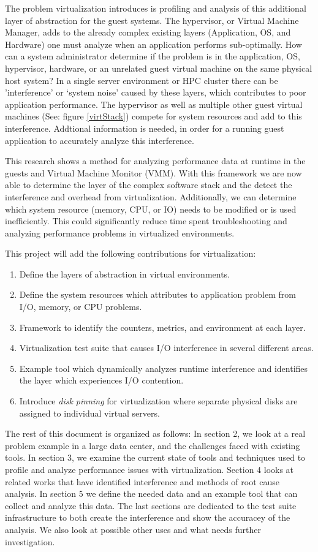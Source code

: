\indent The problem virtualization introduces is profiling and analysis of this additional layer of abstraction for the guest systems.  The hypervisor, or Virtual Machine Manager, adds to the already complex existing layers (Application, OS, and Hardware) one must analyze when an application performs sub-optimally.  How can a system administrator determine if the problem is in the application, OS, hypervisor, hardware, or an unrelated guest virtual machine on the same physical host system?  In a single server environment or HPC cluster there can be 'interference' \cite{paul} or ‘system noise' caused by these layers, which contributes to poor application performance.  The hypervisor as well as multiple other guest virtual machines (See: figure \ref{virtStack}) compete for system resources and add to this interference.  Addtional information is needed, in order for a running guest application to accurately analyze this interference.

\indent This research shows a method for analyzing performance data at runtime in the guests and Virtual Machine Monitor (VMM).   With this framework we are now able to determine the layer of the complex software stack and the detect the interference and overhead from virtualization.  Additionally, we can determine which system resource (memory, CPU, or IO) needs to be modified or is used inefficiently.  This could significantly reduce time spent troubleshooting and analyzing performance problems in virtualized environments.

\indent This project will add the following contributions for virtualization:
\begin{enumerate}
\item Define the layers of abstraction in virtual environments.
\item Define the system resources which attributes to application problem from I/O, memory, or CPU problems.
\item Framework to identify the counters, metrics, and environment at each layer.
\item Virtualization test suite that causes I/O interference in several different areas.
\item Example tool which dynamically analyzes runtime interference and identifies the layer which experiences I/O contention.
\item Introduce \emph{disk pinning} for virtualization where separate physical disks are assigned to individual virtual servers.
\end{enumerate}

\indent The rest of this document is organized as follows:  In section 2, we look at a real problem example in a large data center, and the challenges faced with existing tools.  In section 3, we examine the current state of tools and techniques used to profile and analyze performance issues with virtualization.  Section 4 looks at related works that have identified interference and methods of root cause analysis.  In section 5 we define the needed data and an example tool that can collect and analyze this data.  The last sections are dedicated to the test suite infrastructure to both create the interference and show the accuracey of the analysis.  We also look at possible other uses and what needs further investigation.

